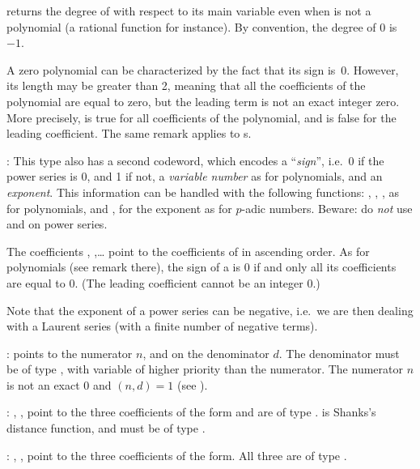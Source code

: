  returns the degree of  with respect to its
main variable even when  is not a polynomial (a rational function for
instance). By convention, the degree of $0$ is~$-1$.

 A zero polynomial can be characterized by the
fact that its sign is~0. However, its length may be greater than 2, meaning
that all the coefficients of the polynomial are equal to zero, but the
leading term  is not an exact integer zero. More precisely,
 is true for all coefficients  of the polynomial,
and  is false for the leading coefficient. The same
remark applies to s.

:
This type also has a second codeword, which
encodes a ``\emph{sign}'', i.e.~0 if the power series is 0, and 1 if not, a
\emph{variable number} as for polynomials, and an \emph{exponent}. This
information can be handled with the following functions: ,
, ,  as for polynomials, and ,
 for the exponent as for $p$-adic numbers. Beware: do \emph{not}
use  and  on power series.

The coefficients , ,\dots {} point to
the coefficients of  in ascending order. As for polynomials
(see remark there), the sign of a  is $0$ if and only all
its coefficients are equal to $0$. (The leading coefficient cannot be an
integer $0$.)

Note that the exponent of a power series can be negative, i.e.~we are
then dealing with a Laurent series (with a finite number of negative
terms).

:%
  points to the
numerator $n$,
and  on the denominator $d$. The denominator must be of type ,
with variable of higher priority than the numerator. The numerator
$n$ is not an exact $0$ and $(n,d) = 1$ (see ).

:%
 ,
,  point to the three coefficients of the form and are of
type .  is Shanks's distance function, and must be of type
.

:%
 , ,
 point to the three coefficients of the form. All three are of type
.

